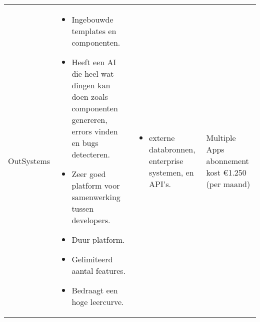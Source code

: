 \begin{longtable}{p{2.5cm} p{5.5cm} p{3.5cm} p{2.5cm}}
    OutSystems & 
    \vspace{-\topsep}\vspace{-\partopsep} 
    \begin{itemize}[leftmargin=2pt, topsep=0pt,parsep=0pt,noitemsep]
        \item[] Ingebouwde templates en componenten.
        \item[] Heeft een AI die heel wat dingen kan doen zoals componenten genereren, errors vinden en bugs detecteren. 
        \item[] Zeer goed platform voor samenwerking tussen developers.
    \end{itemize} 
    \begin{itemize}[leftmargin=2pt, topsep=8pt,parsep=0pt,noitemsep]
        \item[]  Duur platform.
        \item[]  Gelimiteerd aantal features.
        \item[]  Bedraagt een hoge leercurve.
    \end{itemize} &
    \vspace{-\topsep}\vspace{-\partopsep} 
    \begin{itemize}[leftmargin=2pt, topsep=0pt,parsep=0pt,noitemsep]
        \item[] externe databronnen, enterprise systemen, en API's. 
    \end{itemize}
    &
    Multiple Apps abonnement kost €1.250 (per maand)\\


\end{longtable}
